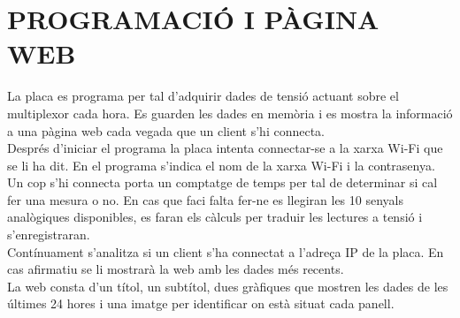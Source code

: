 \chapter{\uppercase{Programació i pàgina web}}

La placa es programa per tal d'adquirir dades de tensió actuant sobre el multiplexor cada hora. Es guarden les dades en memòria i es mostra la informació a una pàgina web cada vegada que un client s'hi connecta.\\
\newline Després d'iniciar el programa la placa intenta connectar-se a la xarxa Wi-Fi que se li ha dit. En el programa s'indica el nom de la xarxa Wi-Fi i la contrasenya.\\
\newline Un cop s'hi connecta porta un comptatge de temps per tal de determinar si cal fer una mesura o no. En cas que faci falta fer-ne es llegiran les 10 senyals analògiques disponibles, es faran els càlculs per traduir les lectures a tensió i s'enregistraran.\\
\newline Contínuament s'analitza si un client s'ha connectat a l'adreça IP de la placa. En cas afirmatiu se li mostrarà la web amb les dades més recents.\\
\newline La web consta d'un títol, un subtítol, dues gràfiques que mostren les dades de les últimes 24 hores i una imatge per identificar on està situat cada panell.



\clearpage



